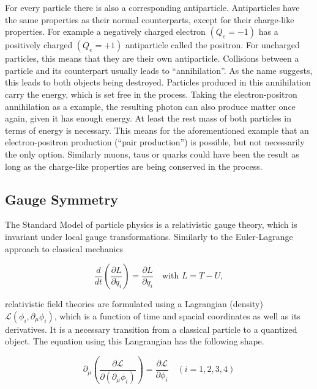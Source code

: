 For every particle there is also a corresponding antiparticle. Antiparticles have the same properties as their normal counterparts, except for their charge-like properties. For example a negatively charged electron $(Q_e = -1)$ has a positively charged $(Q_e = +1)$ antiparticle called the positron. For uncharged particles, this means that they are their own antiparticle. Collisions between a particle and its counterpart usually leads to ``annihilation''. As the name suggests, this leads to both objects being destroyed. Particles produced in this annihilation carry the energy, which is set free in the process. Taking the electron-positron annihilation as a example, the resulting photon can also produce matter once again, given it has enough energy. At least the rest mass of both particles in terms of energy is necessary. This means for the aforementioned example that an electron-positron production (``pair production'') is possible, but not necessarily the only option. Similarly muons, taus or quarks could have been the result as long as the charge-like properties are being conserved in the process.


\subsection{Gauge Symmetry}

The Standard Model of particle physics is a relativistic gauge theory, which is invariant under local gauge transformations. Similarly to the Euler-Lagrange approach to classical mechanics

\begin{equation}
  \label{eq:eulerlagrange}
  \frac{d}{dt} \left( \frac{\partial L}{\partial \dot{q}_i} \right) =  \frac{\partial L}{\partial q_i} \quad \text{with } L = T - U,
\end{equation}

\noindent relativistic field theories are formulated using a Lagrangian (density) $\mathcal{L} ( \phi_i, \partial_\mu \phi_i )$, which is a function of time and spacial coordinates as well as its derivatives. It is a necessary transition from a classical particle to a quantized object. The equation using this Langrangian has the following shape.

\begin{equation}
  \label{eq:lagrangian}
  \partial_\mu \left( \frac{\partial \mathcal{L}}{\partial (\partial_\mu \phi_i)} \right) = \frac{\partial \mathcal{L}}{\partial \phi_i} \quad (i = 1, 2, 3, 4)
\end{equation}

